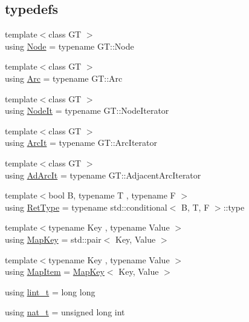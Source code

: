\subsection*{typedefs}
\begin{DoxyCompactItemize}
\item 
{\footnotesize template$<$class GT $>$ }\\using \hyperlink{namespace_designar_a5af326c65aa2bd26b26c410f2030d09e}{Node} = typename G\+T\+::\+Node
\item 
{\footnotesize template$<$class GT $>$ }\\using \hyperlink{namespace_designar_a3f55fb5513d62ff47cbc8f72b8e95d6f}{Arc} = typename G\+T\+::\+Arc
\item 
{\footnotesize template$<$class GT $>$ }\\using \hyperlink{namespace_designar_a5fdef28ed7c6b948482379ebabf927ce}{Node\+It} = typename G\+T\+::\+Node\+Iterator
\item 
{\footnotesize template$<$class GT $>$ }\\using \hyperlink{namespace_designar_a30ebaaade3ffa312c33d6e1234a96952}{Arc\+It} = typename G\+T\+::\+Arc\+Iterator
\item 
{\footnotesize template$<$class GT $>$ }\\using \hyperlink{namespace_designar_a88b020661576bc09a536766283ec1790}{Ad\+Arc\+It} = typename G\+T\+::\+Adjacent\+Arc\+Iterator
\item 
{\footnotesize template$<$bool B, typename T , typename F $>$ }\\using \hyperlink{namespace_designar_ab937f9c4bf5f1d0e65dbc616245d50ee}{Ret\+Type} = typename std\+::conditional$<$ B, T, F $>$\+::type
\item 
{\footnotesize template$<$typename Key , typename Value $>$ }\\using \hyperlink{namespace_designar_a7394b1b25278abf7211e77b91eb5204f}{Map\+Key} = std\+::pair$<$ Key, Value $>$
\item 
{\footnotesize template$<$typename Key , typename Value $>$ }\\using \hyperlink{namespace_designar_abc6ea5602461a15100a645d1f0e5cbcb}{Map\+Item} = \hyperlink{namespace_designar_a7394b1b25278abf7211e77b91eb5204f}{Map\+Key}$<$ Key, Value $>$
\item 
using \hyperlink{namespace_designar_a9d113d66a39e82b73727c72cd3a52f73}{lint\+\_\+t} = long long
\item 
using \hyperlink{namespace_designar_aa72662848b9f4815e7bf31a7cf3e33d1}{nat\+\_\+t} = unsigned long int

\end{DoxyCompactItemize}
